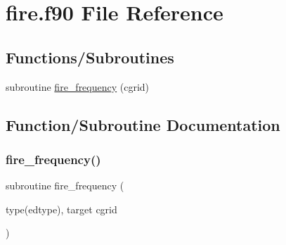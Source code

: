 \hypertarget{fire_8f90}{}\section{fire.\+f90 File Reference}
\label{fire_8f90}
\subsection*{Functions/\+Subroutines}
\begin{DoxyCompactItemize}
\item 
subroutine \hyperlink{fire_8f90_aea4e862c5ebe7ca6ea0fb7003325d1c0}{fire\+\_\+frequency} (cgrid)
\end{DoxyCompactItemize}


\subsection{Function/\+Subroutine Documentation}
\mbox{\label{fire_8f90_aea4e862c5ebe7ca6ea0fb7003325d1c0}} 
\subsubsection{\texorpdfstring{fire\+\_\+frequency()}{fire\_frequency()}}
{\footnotesize\ttfamily subroutine fire\+\_\+frequency (\begin{DoxyParamCaption}\item[{type(edtype), target}]{cgrid }\end{DoxyParamCaption})}

